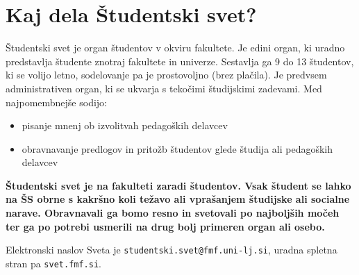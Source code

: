 \documentclass[a4paper,oneside,12pt]{article}
\title{\Title}
\author{\Author}
\date{\today}
\theoremstyle{definition}
\begin{document}

\section*{Kaj dela Študentski svet?}

Študentski svet je organ študentov v okviru fakultete. Je edini organ, ki uradno predstavlja
študente znotraj fakultete in univerze. Sestavlja ga 9 do 13 študentov, ki se volijo letno,
sodelovanje pa je prostovoljno (brez plačila). Je predvsem administrativen organ, ki se ukvarja s
tekočimi študijskimi zadevami. Med najpomembnejše sodijo:
\begin{itemize}
  \item pisanje mnenj ob izvolitvah pedagoških delavcev
  \item obravnavanje predlogov in pritožb študentov glede študija ali pedagoških delavcev
\end{itemize}

\textbf{Študentski svet je na fakulteti zaradi študentov. Vsak študent se lahko na ŠS obrne s
kakršno koli težavo ali vprašanjem študijske ali socialne narave. Obravnavali ga bomo resno in
svetovali po najboljših močeh ter ga po potrebi usmerili na drug bolj primeren organ ali osebo.}

Elektronski naslov Sveta je \texttt{studentski.svet@fmf.uni-lj.si}, uradna spletna stran pa
\texttt{svet.fmf.si}.
\end{document}

